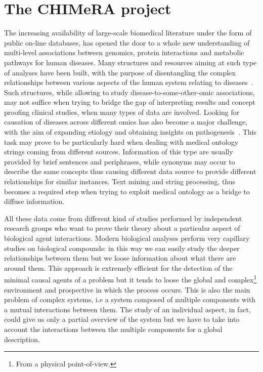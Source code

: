 \documentclass{standalone}
\begin{document}
\section[CHIMeRA]{The CHIMeRA project}\label{chimera:chimera}

The increasing availability of large-scale biomedical literature under the form of public on-line databases, has opened the door to a whole new understanding of multi-level associations between genomics, protein interactions and metabolic pathways for human diseases.
Many structures and resources aiming at such type of analyses have been built, with the purpose of disentangling the complex relationships between various aspects of the human system relating to diseases~\cite{SymtomsNet, HumanPhenotype, chimerDB2017}.
Such structures, while allowing to study disease-to-some-other-omic associations, may not suffice when trying to bridge the gap of interpreting results and concept proofing clinical studies, when many types of data are involved.
Looking for causation of diseases across different omics has also become a major challenge, with the aim of expanding etiology and obtaining insights on pathogenesis~\cite{Barabasi2007}.
This task may prove to be particularly hard when dealing with medical ontology strings coming from different sources.
Information of this type are usually provided by brief sentences and periphrases, while synonyms may occur to describe the same concepts thus causing different data source to provide different relationships for similar instances.
Text mining and string processing, thus becomes a required step when trying to exploit medical ontology as a bridge to diffuse information.

All these data come from different kind of studies performed by independent research groups who want to prove their theory about a particular aspect of biological agent interactions.
Modern biological analyses perform very capillary studies on biological compounds: in this way we can easily study the deeper relationships between them but we loose information about what there are around them.
This approach is extremely efficient for the detection of the minimal causal agents of a problem but it tends to loose the global and complex\footnote{
  From a physical point-of-view.
} environment and prospective in which the process occurs.
This is also the main problem of complex systems, i.e a system composed of multiple components with a mutual interactions between them.
The study of an individual aspect, in fact, could give us only a partial overview of the system but we have to take into account the interactions between the multiple components for a global description.
\end{document}
